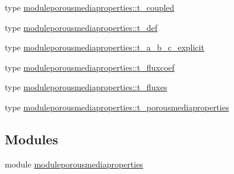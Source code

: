 \begin{DoxyCompactItemize}
\item 
type \mbox{\hyperlink{structmoduleporousmediaproperties_1_1t__coupled}{moduleporousmediaproperties\+::t\+\_\+coupled}}
\item 
type \mbox{\hyperlink{structmoduleporousmediaproperties_1_1t__def}{moduleporousmediaproperties\+::t\+\_\+def}}
\item 
type \mbox{\hyperlink{structmoduleporousmediaproperties_1_1t__a__b__c__explicit}{moduleporousmediaproperties\+::t\+\_\+a\+\_\+b\+\_\+c\+\_\+explicit}}
\item 
type \mbox{\hyperlink{structmoduleporousmediaproperties_1_1t__fluxcoef}{moduleporousmediaproperties\+::t\+\_\+fluxcoef}}
\item 
type \mbox{\hyperlink{structmoduleporousmediaproperties_1_1t__fluxes}{moduleporousmediaproperties\+::t\+\_\+fluxes}}
\item 
type \mbox{\hyperlink{structmoduleporousmediaproperties_1_1t__porousmediaproperties}{moduleporousmediaproperties\+::t\+\_\+porousmediaproperties}}
\end{DoxyCompactItemize}
\subsection*{Modules}
\begin{DoxyCompactItemize}
\item 
module \mbox{\hyperlink{namespacemoduleporousmediaproperties}{moduleporousmediaproperties}}
\end{DoxyCompactItemize}
